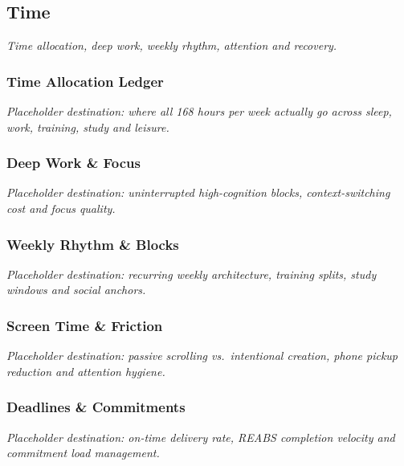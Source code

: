 \documentclass{article}
\begin{document}
\subsection{Time}\label{sec:time}
\textit{Time allocation, deep work, weekly rhythm, attention and recovery.}

\subsubsection{Time Allocation Ledger}\label{sec:time-allocation-ledger}
\textit{Placeholder destination: where all 168 hours per week actually go across sleep, work, training, study and leisure.}

\subsubsection{Deep Work \& Focus}\label{sec:deep-work-and-focus}
\textit{Placeholder destination: uninterrupted high-cognition blocks, context-switching cost and focus quality.}

\subsubsection{Weekly Rhythm \& Blocks}\label{sec:weekly-rhythm-and-blocks}
\textit{Placeholder destination: recurring weekly architecture, training splits, study windows and social anchors.}

\subsubsection{Screen Time \& Friction}\label{sec:screen-time-and-friction}
\textit{Placeholder destination: passive scrolling vs.\ intentional creation, phone pickup reduction and attention hygiene.}

\subsubsection{Deadlines \& Commitments}\label{sec:deadlines-and-commitments}
\textit{Placeholder destination: on-time delivery rate, REABS completion velocity and commitment load management.}
\end{document}
